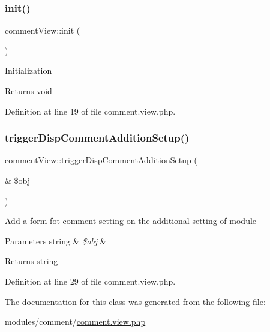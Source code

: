 \subsubsection{\texorpdfstring{init()}{init()}}
{\footnotesize\ttfamily comment\+View\+::init (\begin{DoxyParamCaption}{ }\end{DoxyParamCaption})}

Initialization \begin{DoxyReturn}{Returns}
void 
\end{DoxyReturn}


Definition at line 19 of file comment.\+view.\+php.

\mbox{\label{classcommentView_ad2504c48d3411458dcdd88d1d681aba7}} 
\subsubsection{\texorpdfstring{trigger\+Disp\+Comment\+Addition\+Setup()}{triggerDispCommentAdditionSetup()}}
{\footnotesize\ttfamily comment\+View\+::trigger\+Disp\+Comment\+Addition\+Setup (\begin{DoxyParamCaption}\item[{\&}]{\$obj }\end{DoxyParamCaption})}

Add a form fot comment setting on the additional setting of module 
\begin{DoxyParams}[1]{Parameters}
string & {\em \$obj} & \\
\hline
\end{DoxyParams}
\begin{DoxyReturn}{Returns}
string 
\end{DoxyReturn}


Definition at line 29 of file comment.\+view.\+php.



The documentation for this class was generated from the following file\+:\begin{DoxyCompactItemize}
\item 
modules/comment/\hyperlink{comment_8view_8php}{comment.\+view.\+php}\end{DoxyCompactItemize}
